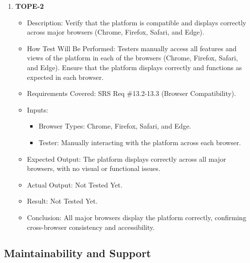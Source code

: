 \documentclass[12pt, titlepage]{article}
\begin{document}
\begin{enumerate}
    \item \textbf{TOPE-2}  
    \begin{itemize}
        \item Description: Verify that the platform is compatible and displays correctly across major browsers (Chrome, Firefox, Safari, and Edge).
        \item How Test Will Be Performed: Testers manually access all features and views of the platform in each of the browsers (Chrome, Firefox, Safari, and Edge). Ensure that the platform displays correctly and functions as expected in each browser.
        \item Requirements Covered: SRS Req \#13.2-13.3 (Browser Compatibility).
        \item Inputs:  
            \begin{itemize}
                \item Browser Types: Chrome, Firefox, Safari, and Edge.
                \item Tester: Manually interacting with the platform across each browser.
            \end{itemize}
        \item Expected Output: The platform displays correctly across all major browsers, with no visual or functional issues.
        \item Actual Output: Not Tested Yet.
        \item Result: Not Tested Yet.
        \item Conclusion: All major browsers display the platform correctly, confirming cross-browser consistency and accessibility.
    \end{itemize}
\end{enumerate}

\subsection{Maintainability and Support}
\end{document}
